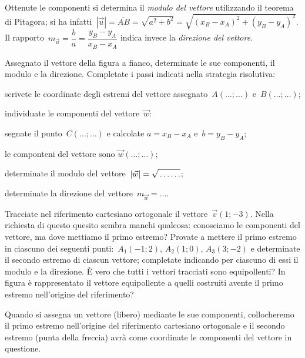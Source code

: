 Ottenute le componenti si determina il \emph{modulo del vettore} utilizzando il teorema di Pitagora; si ha infatti~$|\vec{u}|=\overline{AB}=\sqrt{a^2+b^2}=\sqrt{(x_B-x_A)^2+(y_B-y_A)^2}$.
Il rapporto~$m_{\vec{u}}=\dfrac{b}{a}=\dfrac{y_B-y_A}{x_B-x_A}$ indica invece la \emph{direzione del vettore}.
	
\begin{exrig}
\begin{esempio}
\begin{multicols}{2}
Assegnato il vettore della figura a fianco, determinate le sue componenti, il modulo e la direzione. Completate i passi indicati nella strategia risolutiva:
 \begin{itemize*}
\item scrivete le coordinate degli estremi del vettore assegnato~$A(\ldots;\ldots)$ e~$B(\ldots;\ldots)$;
\item individuate le componenti del vettore~$\vec{w}$:
\begin{itemize*}
\item segnate il punto~$C(\ldots;\ldots)$ e calcolate $a=x_B-x_A$ e~$b=y_B-y_A$;
\item le componteni del vettore sono $\vec{w}(\ldots;\ldots)$;
\end{itemize*}
\item determinate il modulo del vettore~$|\vec{w}|=\sqrt{\vphantom{0}\ldots\ldots}$;
\item determinate la direzione del vettore~$m_{\vec{w}}=\ldots$.
\end{itemize*}
\begin{center}
 
\end{center}
\end{multicols}
\end{esempio}

\begin{esempio}
\begin{multicols}{2}
 Tracciate nel riferimento cartesiano ortogonale il vettore~$\vec{v}(1;-3)$. Nella richiesta di questo quesito sembra manchi qualcosa: conosciamo
le componenti del vettore, ma dove mettiamo il primo estremo? Provate a mettere il primo estremo in ciascuno dei seguenti punti:~$A_1(-1;2)$, $A_2(1;0)$, $A_3(3;-2)$
e determinate il secondo estremo di ciascun vettore; completate indicando per ciascuno di essi il modulo e la direzione. È vero che tutti i vettori tracciati sono equipollenti?
In figura è rappresentato il vettore equipollente a quelli costruiti avente il primo estremo nell'origine del riferimento?
\begin{center}
 
\end{center}

\end{multicols}

\osservazione
Quando si assegna un vettore (libero) mediante le sue componenti, collocheremo il primo estremo
nell'origine del riferimento cartesiano ortogonale e il secondo estremo (punta della freccia) avrà come
coordinate le componenti del vettore in questione.
\end{esempio}
\end{exrig}

